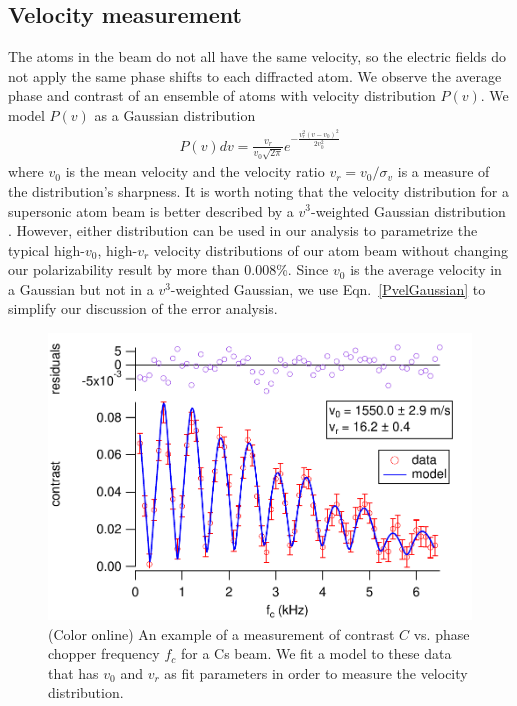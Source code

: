 \documentclass[twocolumn,pra,showpacs,superscriptaddress,longbibliography]{revtex4-1}   %
\newcommand{\eqnref}[1]{Eqn.~\eqref{#1}}
\begin{document}
\subsection{Velocity measurement} \label{sectionVelocity}

The atoms in the beam do not all have the same velocity, so the electric fields do not apply the same phase shifts to each diffracted atom.
We observe the average phase and contrast of an ensemble of atoms with velocity distribution $P(v)$. 
We model $P(v)$ as a Gaussian distribution
\begin{align}
	P(v)dv = \frac{v_r}{v_0\sqrt{2\pi}}e^{-\frac{v_r^2(v-v_0)^2}{2v_0^2}}
	\label{PvelGaussian}
\end{align}
where $v_0$ is the mean velocity and the velocity ratio $v_r = v_0/\sigma_v$ is a measure of the distribution's sharpness. It is worth noting that the velocity distribution for a supersonic atom beam is better described by a $v^3$-weighted Gaussian distribution
\cite{Berman1997}. However, either distribution can be used in our analysis to parametrize the typical high-$v_0$, high-$v_r$ velocity distributions of our atom beam without changing our polarizability result by more than 0.008\%. Since $v_0$ is the average velocity in a Gaussian but not in a $v^3$-weighted Gaussian, we use \eqnref{PvelGaussian} to simplify our discussion of the error analysis. 


\begin{figure}
\includegraphics[width=\linewidth,keepaspectratio]{CvCF_150420_ca.pdf}
\caption{\label{CvCFExample}(Color online) An example of a measurement of contrast $C$ vs. phase chopper frequency $f_c$ for a Cs beam. We fit a model to these data that has $v_0$ and $v_r$ as fit parameters in order to measure the velocity distribution.}
\end{figure}
\end{document}
